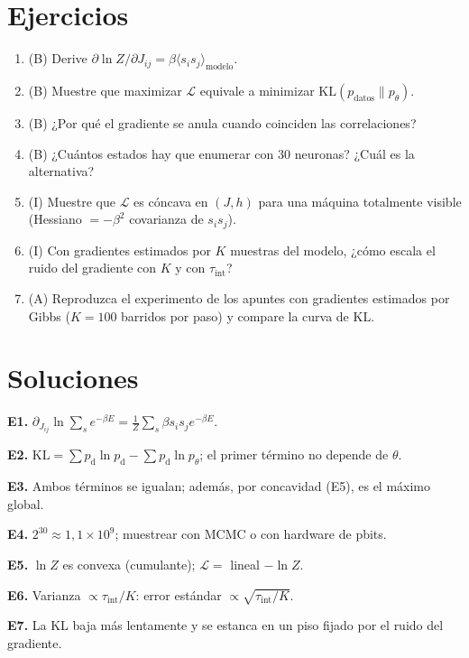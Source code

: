 \documentclass[11pt,a4paper]{article}
\begin{document}
\section{Ejercicios}
\begin{enumerate}[label=\textbf{E\arabic*.}]
\item (B) Derive $\partial\ln Z/\partial J_{ij}=\beta\langle s_is_j\rangle_{\text{modelo}}$.
\item (B) Muestre que maximizar $\mathcal L$ equivale a minimizar $\mathrm{KL}(p_{\text{datos}}\|p_\theta)$.
\item (B) ¿Por qué el gradiente se anula cuando coinciden las correlaciones?
\item (B) ¿Cuántos estados hay que enumerar con 30 neuronas? ¿Cuál es la alternativa?
\item (I) Muestre que $\mathcal L$ es cóncava en $(J,h)$ para una máquina totalmente visible (Hessiano $=-\beta^2$ covarianza de $s_is_j$).
\item (I) Con gradientes estimados por $K$ muestras del modelo, ¿cómo escala el ruido del gradiente con $K$ y con $\tau_{\text{int}}$?
\item (A) Reproduzca el experimento de los apuntes con gradientes estimados por Gibbs ($K=100$ barridos por paso) y compare la curva de KL.
\end{enumerate}
\section{Soluciones}
\begin{solucion}
\textbf{E1.} $\partial_{J_{ij}}\ln\sum_se^{-\beta E}=\frac1Z\sum_s\beta s_is_je^{-\beta E}$.

\textbf{E2.} $\mathrm{KL}=\sum p_{\text{d}}\ln p_{\text{d}}-\sum p_{\text{d}}\ln p_\theta$; el primer término no depende de $\theta$.

\textbf{E3.} Ambos términos se igualan; además, por concavidad (E5), es el máximo global.

\textbf{E4.} $2^{30}\approx1{,}1\times10^9$; muestrear con MCMC o con hardware de pbits.

\textbf{E5.} $\ln Z$ es convexa (cumulante); $\mathcal L=$ lineal $-\ln Z$.

\textbf{E6.} Varianza $\propto\tau_{\text{int}}/K$: error estándar $\propto\sqrt{\tau_{\text{int}}/K}$.

\textbf{E7.} La KL baja más lentamente y se estanca en un piso fijado por el ruido del gradiente.
\end{solucion}
\end{document}
